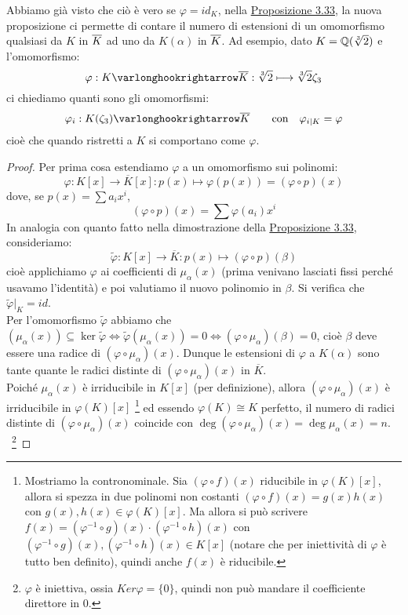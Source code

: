 \documentclass[11pt]{scrartcl}
\begin{document}
\begin{remark}
    Abbiamo già visto che ciò è vero se $\varphi = id_K$, nella \hyperref[3.33]{Proposizione 3.33},
    la nuova proposizione ci permette di contare il numero di estensioni di un omomorfismo qualsiasi da $K$ in $\overline K$ ad uno da $K(\alpha)$ in $\overline K$.
    Ad esempio, dato $K = \mathbb Q(\sqrt[3]{2})$ e l'omomorfismo:
    \[ \varphi : K \varlonghookrightarrow \ol K : \sqrt[3]{2} \longmapsto \sqrt[3]{2}\zeta_3
        \]
    ci chiediamo quanti sono gli omomorfismi:
    \[ \varphi_i : K(\zeta_3) \varlonghookrightarrow \ol K \qquad \text{con} \quad \varphi_{i|K} = \varphi
        \]
    cioè che quando ristretti a $K$ si comportano come $\varphi$.
\end{remark}

\begin{proof}
    Per prima cosa estendiamo $\varphi$ a un omomorfismo sui polinomi:
    \[ \varphi : K[x] \longrightarrow \overline{K}[x] : p(x) \longmapsto \varphi(p(x)) = (\varphi \circ p)(x)
        \]
    dove, se $p(x) = \sum{a_i x^i}$,
    \[ (\varphi \circ p)(x) = \sum{\varphi(a_i) x^i}
        \]
    In analogia con quanto fatto nella dimostrazione della \hyperref[3.33]{Proposizione 3.33}, consideriamo:
    \[ \widetilde{\varphi} : K[x] \longrightarrow \overline K : p(x) \longmapsto (\varphi \circ p)(\beta)
        \]
    cioè applichiamo $\varphi$ ai coefficienti di $\mu_\alpha(x)$ (prima venivano lasciati fissi perché usavamo l'identità) e poi valutiamo il nuovo polinomio in $\beta$. Si verifica che $\widetilde{\varphi}|_{K} = id$. \\
    Per l'omomorfismo $\widetilde{\varphi}$ abbiamo che $(\mu_\alpha(x)) \subseteq \ker \widetilde{\varphi} \iff \widetilde{\varphi}(\mu_\alpha(x)) = 0 \iff (\varphi \circ \mu_\alpha)(\beta) = 0$, cioè $\beta$ deve essere una radice di $(\varphi \circ \mu_\alpha)(x)$. 
    Dunque le estensioni di $\varphi$ a $K(\alpha)$ sono tante quante le radici distinte di $(\varphi \circ \mu_\alpha)(x)$ in $\overline K$. \\
    Poiché $\mu_\alpha(x)$ è irriducibile in $K[x]$ (per definizione), allora $(\varphi \circ \mu_\alpha)(x)$ è irriducibile in $\varphi(K)[x]$ 
    \footnote{Mostriamo la contronominale. Sia $(\varphi \circ f)(x)$ riducibile in $\varphi(K)[x]$, allora si spezza in due polinomi non costanti $(\varphi \circ f)(x) = g(x)h(x)$ con $g(x), h(x) \in \varphi(K)[x]$. Ma allora si può scrivere $f(x) = (\varphi^{-1} \circ g)(x)\cdot(\varphi^{-1} \circ h)(x)$ con $(\varphi^{-1} \circ g)(x), (\varphi^{-1} \circ h)(x) \in K[x]$ (notare che per iniettività di $\varphi$ è tutto ben definito), quindi anche $f(x)$ è riducibile.}
    ed essendo $\varphi(K) \cong K$ perfetto, il numero di radici distinte di $(\varphi \circ \mu_\alpha)(x)$ coincide con
    $\deg (\varphi \circ \mu_\alpha)(x) = \deg \mu_\alpha(x) = n$. 
    ~\footnote{$\varphi$ è iniettiva, ossia $Ker \varphi = \{0\}$, quindi non può mandare il coefficiente direttore in 0.}
\end{proof}
\end{document}
